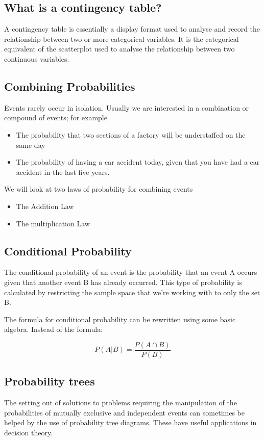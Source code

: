 \documentclass[12pt]{article}
\begin{document}
\subsection*{What is a contingency table?}

A contingency table is essentially a display format used to analyse and record the relationship between two or more categorical variables. It is the categorical equivalent of the scatterplot used to analyse the relationship between two continuous variables.

\subsection{Combining Probabilities}

Events rarely occur in isolation. Usually we are interested in a combination or compound of events; for example
\begin{itemize}
\item The probability that two sections of a factory will be understaffed on the same day 
\item The probability of having a car accident today, given that you have had a car accident in the last five years.
\end{itemize}	

We will look at two laws of probability for combining events
\begin{itemize}
\item The Addition Law 
\item The multiplication Law
\end{itemize}	


\subsection{Conditional Probability}
The conditional probability of an event is the probability that an event A occurs given that another event B has already occurred. This type of probability is calculated by restricting the sample space that we’re working with to only the set B.

The formula for conditional probability can be rewritten using some basic algebra. Instead of the formula:

\[P(A | B) = \frac{P(A \cap B) }{P( B )}  \]

\subsection{Probability trees}
The setting out of solutions to problems requiring the manipulation of the probabilities of mutually exclusive and independent events can sometimes be helped by the use of probability tree diagrams. These have useful applications in decision theory.
\end{document}
